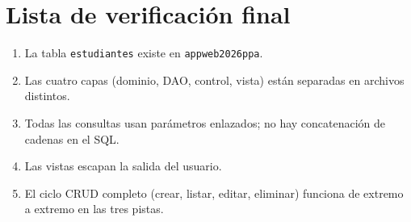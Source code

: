 \documentclass[11pt,a4paper,openany]{book}
\begin{document}
\section{Lista de verificación final}
\label{ap:crud:checklist}

\begin{enumerate}
\item La tabla \texttt{estudiantes} existe en \texttt{appweb2026ppa}.
\item Las cuatro capas (dominio, DAO, control, vista) están separadas
en archivos distintos.
\item Todas las consultas usan parámetros enlazados; no hay
concatenación de cadenas en el SQL.
\item Las vistas escapan la salida del usuario.
\item El ciclo CRUD completo (crear, listar, editar, eliminar) funciona
de extremo a extremo en las tres pistas.
\end{enumerate}

\backmatter
{}


\end{document}
